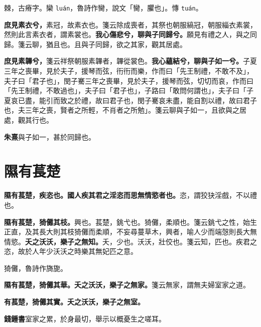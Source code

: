 \begin{quoting}棘，古瘠字。欒 \texttt{luán}，魯詩作臠，說文「臠，臞也」。慱 \texttt{tuán}。\end{quoting}

\textbf{庶見素衣兮，}{\footnotesize 素冠，故素衣也。箋云除成喪者，其祭也朝服縞冠，朝服緇衣素裳，然則此言素衣者，謂素裳也。}\textbf{我心傷悲兮，聊與子同歸兮。}{\footnotesize 願見有禮之人，與之同歸。箋云聊，猶且也。且與子同歸，欲之其家，觀其居處。}

\textbf{庶見素韠兮，}{\footnotesize 箋云祥祭朝服素韠者，韠從裳色。}\textbf{我心蘊結兮，聊與子如一兮。}{\footnotesize 子夏三年之喪畢，見於夫子，援琴而弦，衎衎而樂，作而曰「先王制禮，不敢不及」，夫子曰「君子也」，閔子騫三年之喪畢，見於夫子，援琴而弦，切切而哀，作而曰「先王制禮，不敢過也」，夫子曰「君子也」，子路曰「敢問何謂也」，夫子曰「子夏哀已盡，能引而致之於禮，故曰君子也，閔子騫哀未盡，能自割以禮，故曰君子也，夫三年之喪，賢者之所輕，不肖者之所勉」。箋云聊與子如一，且欲與之居處，觀其行也。}

\begin{quoting}\textbf{朱熹}與子如一，甚於同歸也。\end{quoting}

\section{隰有萇楚}


\textbf{隰有萇楚，疾恣也。國人疾其君之淫恣而思無情慾者也。}{\footnotesize 恣，謂狡㹟淫戲，不以禮也。}

\textbf{隰有萇楚，猗儺其枝。}{\footnotesize 興也。萇楚，銚弋也。猗儺，柔順也。箋云銚弋之性，始生正直，及其長大則其枝猗儺而柔順，不妄尋蔓草木，興者，喻人少而端愨則長大無情慾。}\textbf{夭之沃沃，樂子之無知。}{\footnotesize 夭，少也。沃沃，壯佼也。箋云知，匹也。疾君之恣，故於人年少沃沃之時樂其無妃匹之意。}

\begin{quoting}猗儺，魯詩作旖旎。\end{quoting}

\textbf{隰有萇楚，猗儺其華。夭之沃沃，樂子之無家。}{\footnotesize 箋云無家，謂無夫婦室家之道。}

\textbf{有萇楚，猗儺其實。夭之沃沃，樂子之無室。}

\begin{quoting}\textbf{錢鍾書}室家之累，於身最切，舉示以概憂生之嗟耳。\end{quoting}

